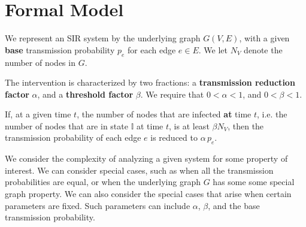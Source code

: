 \documentclass[11pt]{article}
\newcommand{\istate}{\mbox{$\mathbb{I}$}}
\begin{document}
\section{Formal Model}
\label{sec:formal_model}

We represent an SIR
system by the underlying graph $G(V,E)$, with
a given {\bf base} transmission probability $p_e$ for each
edge $e \in E$. 
We let $N_V$ denote the number of nodes in $G$.
 
 The intervention is characterized by two fractions:
a {\bf transmission reduction factor} $\alpha$, 
and a {\bf threshold factor} $\beta$.
We require that $0 < \alpha <1$, and $0 < \beta <1$.

If, at a given time $t$, the number of nodes that are infected {\bf at} time $t$,
i.e. the number of nodes that are in state $\istate$ at time $t$,
 is at least $\beta N_V$,
then the transmission probability of each edge $e$ is reduced to $\alpha \, p_e$.

We consider the complexity of analyzing a given system for some property of interest.
We can consider special cases, such as when all the transmission probabilities are equal,
or when the underlying graph $G$ has some some special graph property.
We can also consider the special cases that arise when certain parameters are fixed.
Such parameters can include $\alpha$, $\beta$, and the base transmission probability.
\end{document}
